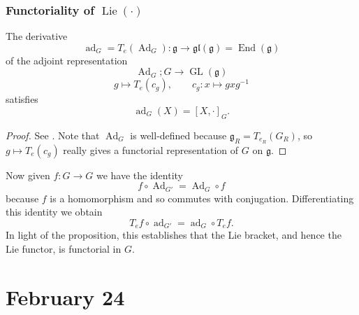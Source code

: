 \documentclass[10pt]{article}
\newcommand{\GL}{\operatorname{GL}}
\newcommand{\Lie}{\operatorname{Lie}}
\renewcommand{\(}{\left(}
\renewcommand{\)}{\right)}
\newcommand{\End}{\operatorname{End}}
\DeclareMathOperator{\Ad}{Ad}
\DeclareMathOperator{\ad}{ad}
\newcommand{\g}{\mathfrak{g}}
\newcommand{\gl}{\mathfrak{gl}}
\numberwithin{thm}{subsection}
\begin{document}
\subsubsection{Functoriality of $\Lie(\cdot)$}
\begin{prop}
The derivative
\[\ad_G=T_e(\Ad_G):\g\to \gl(\g)=\End(\g)\]
of the
 adjoint representation
\[\Ad_G;G\to\GL(\g)\]
\[g\mapsto T_e(c_g),\qquad c_g:x\mapsto gxg^{-1}\]
satisfies
\[\ad_G(X)=[X,\cdot ]_G.\]
\end{prop}
\begin{proof}See \cite[A.7.5]{pred}. 
Note that $\Ad_G$ is well-defined
because $\g_R=T_{e_R}(G_R)$,
so $g\mapsto T_e(c_g)$
really gives a functorial representation
of $G$ on $\g$.
\end{proof}
Now
given $f:G\to G$
we have the
identity
\[f\circ \Ad_{G'}=\Ad_G\circ f\]
because $f$ is a homomorphism and so commutes with conjugation.
Differentiating this identity we obtain
\[T_ef\circ \ad_{G'}=\ad_G\circ T_e f.\]
In light of the proposition, this establishes that the Lie bracket, and hence the Lie functor, is
functorial in $G$. 
\section{February 24}
\end{document}
